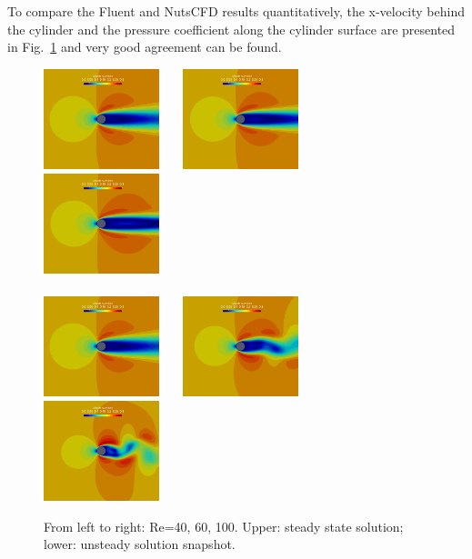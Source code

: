 \documentclass[journal,final]{new-aiaa}
\begin{document}
To compare the Fluent and NutsCFD results quantitatively, the x-velocity
behind the cylinder and the pressure coefficient along the cylinder
surface are presented in Fig.~\ref{fig:cyl-re55-u-cp} and very good agreement
can be found.
\begin{figure}[htb]
	\centering   
	\includegraphics[width=0.3\textwidth]{cylinder-mach-steady-re-40.png}~~~	\includegraphics[width=0.3\textwidth]{cylinder-mach-steady-re-60.png}~~~
	\includegraphics[width=0.3\textwidth]{cylinder-mach-steady-re-100.png}\\
	~\\
	\includegraphics[width=0.3\textwidth]{cylinder-mach-steady-re-40.png}~~~
	\includegraphics[width=0.3\textwidth]{cylinder-mach-unsteady-re-60.png}~~~	
	\includegraphics[width=0.3\textwidth]{cylinder-mach-unsteady-re-100.png}	
	\caption{From left to right: Re=40, 60, 100. Upper: steady state solution;
	lower: unsteady solution snapshot.}
		\label{fig:cyl-re55-u-cp}
\end{figure}
\end{document}
